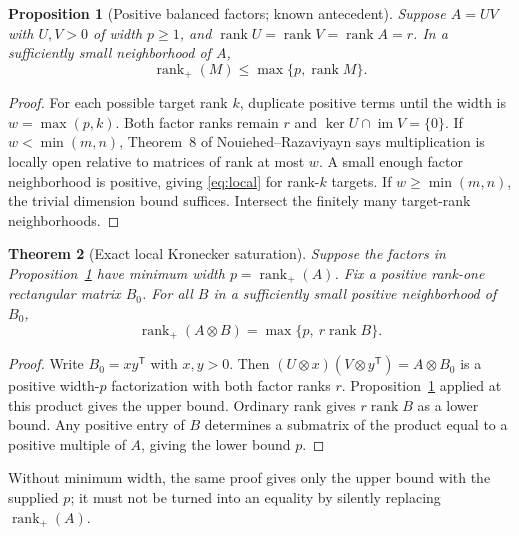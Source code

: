 \documentclass[11pt]{article}
\newtheorem{theorem}{Theorem}[section]
\newtheorem{proposition}[theorem]{Proposition}
\theoremstyle{definition}\newtheorem{definition}[theorem]{Definition}
\theoremstyle{remark}\newtheorem{remark}[theorem]{Remark}
\newcommand{\rk}{\operatorname{rank}}
\newcommand{\rp}{\operatorname{rank}_{+}}
\newcommand{\im}{\operatorname{im}}
\begin{document}
\begin{proposition}[Positive balanced factors; known antecedent]\label{prop:local}
Suppose $A=UV$ with $U,V>0$ of width $p\ge1$, and $\rk U=\rk V=\rk A=r$. In a sufficiently small neighborhood of $A$,
\begin{equation}\label{eq:local}
\rp(M)\le\max\{p,\rk M\}.
\end{equation}
\end{proposition}
\begin{proof}
For each possible target rank $k$, duplicate positive terms until the width is $w=\max(p,k)$. Both factor ranks remain $r$ and $\ker U\cap\im V=\{0\}$. If $w<\min(m,n)$, Theorem~8 of Nouiehed--Razaviyayn \cite{NR} says multiplication is locally open relative to matrices of rank at most $w$. A small enough factor neighborhood is positive, giving \eqref{eq:local} for rank-$k$ targets. If $w\ge\min(m,n)$, the trivial dimension bound suffices. Intersect the finitely many target-rank neighborhoods.
\end{proof}

\begin{theorem}[Exact local Kronecker saturation]\label{thm:localtensor}
Suppose the factors in Proposition~\ref{prop:local} have minimum width $p=\rp(A)$. Fix a positive rank-one rectangular matrix $B_0$. For all $B$ in a sufficiently small positive neighborhood of $B_0$,
\begin{equation}\label{eq:localtensor}
\boxed{\quad\rp(A\otimes B)=\max\{p,\ r\rk B\}.\quad}
\end{equation}
\end{theorem}
\begin{proof}
Write $B_0=xy^{\mathsf T}$ with $x,y>0$. Then $(U\otimes x)(V\otimes y^{\mathsf T})=A\otimes B_0$ is a positive width-$p$ factorization with both factor ranks $r$. Proposition~\ref{prop:local} applied at this product gives the upper bound. Ordinary rank gives $r\rk B$ as a lower bound. Any positive entry of $B$ determines a submatrix of the product equal to a positive multiple of $A$, giving the lower bound $p$.
\end{proof}

Without minimum width, the same proof gives only the upper bound with the supplied $p$; it must not be turned into an equality by silently replacing $\rp(A)$.
\end{document}
